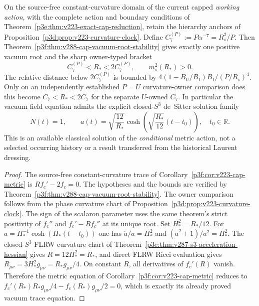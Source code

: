 \documentclass[12pt,a4paper]{article}
\begin{document}
\begin{corollary}
\label{p8:cor:v288-cap-vacuum-target}
On the source-free constant-curvature domain of the current capped
\emph{working action}, with the complete action and boundary conditions
of Theorem~\ref{p3e:thm:v223-exact-cap-reduction}, retain the hierarchy
anchors of Proposition~\ref{p3d:prop:v223-curvature-clock}. Define
\(C_7^{(P)}:=P\alpha^{-7}=R_s^2/P\).
Then Theorem~\ref{p3f:thm:v288-cap-vacuum-root-stability} gives exactly
one positive vacuum root and the sharp owner-typed bracket
\[
 \boxed{C_7^{(P)}<R_*<2C_7^{(P)},\qquad m_s^2(R_*)>0.}
\]
The relative distance below $2C_7^{(P)}$ is bounded by
$4(1-B_U/B_I) B_I/(P/R_s)^4$. Only on an independently established
$P=U$ curvature-owner comparison does this become
$C_7<R_*<2C_7$ for the separate $U$-owned $C_7$.
In particular the vacuum field equation admits the explicit
closed-$S^3$ de~Sitter solution family
\[
 \boxed{N(t)=1,\qquad
 a(t)=\sqrt{\frac{12}{R_*}}
 \cosh\!\left(\sqrt{\frac{R_*}{12}}(t-t_0)\right),
 \quad t_0\in\mathbb R.}
\]
This is an available classical solution of the \emph{conditional}
metric action, not a selected occurring history or a result transferred
from the historical Laurent dressing.
\end{corollary}
\begin{proof}
The source-free constant-curvature trace of
Corollary~\ref{p3f:cor:v223-cap-metric} is
$R f_c'-2f_c=0$. The hypotheses and the bounds are verified by
Theorem~\ref{p3f:thm:v288-cap-vacuum-root-stability}.
The owner comparison follows from the phase curvature chart of
Proposition~\ref{p3d:prop:v223-curvature-clock}.
The sign of the scalaron parameter uses the same theorem's strict
positivity of $f_c''$ and $f_c'-Rf_c''$ at its unique root.
Set $H_*^2=R_*/12$. For $a=H_*^{-1}\cosh(H_*(t-t_0))$ one has
$\ddot a/a=H_*^2$ and $(\dot a^2+1)/a^2=H_*^2$.
The closed-$S^3$ FLRW curvature chart of
Theorem~\ref{p3e:thm:v287-s3-acceleration-hessian} gives
$R=12H_*^2=R_*$, and direct FLRW Ricci evaluation gives
$R_{\mu\nu}=3H_*^2g_{\mu\nu}=R_*g_{\mu\nu}/4$.
On constant $R$, all derivatives of $f_c'(R)$ vanish. Therefore the
metric equation of Corollary~\ref{p3f:cor:v223-cap-metric} reduces to
$f_c'(R_*) R_*g_{\mu\nu}/4-f_c(R_*)g_{\mu\nu}/2=0$,
which is exactly its already proved vacuum trace equation.
\end{proof}
\end{document}
